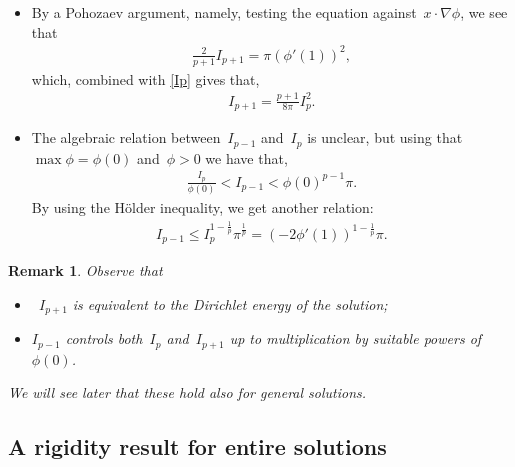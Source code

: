 \documentclass[10pt]{amsart}
\newtheorem{remark}[theorem]{Remark}
\begin{document}
    \begin{itemize}
        \item[(a)] By a Pohozaev argument, namely, testing the equation against~$x\cdot\nabla\phi$, we see that
        \begin{align*}
            \frac{2}{p+1}I_{p+1}=\pi (\phi'(1))^2,
        \end{align*}
        which, combined with \eqref{Ip} gives that,
        \begin{align*}
            I_{p+1}=\frac{p+1}{8\pi}I_p^2.
        \end{align*}

        \item[(b)] The algebraic relation between~$I_{p-1}$ and~$I_p$ is unclear, but using that~$\max\phi=\phi(0)$ and~$\phi>0$ we have that,
        \begin{align*}
            \frac{I_p}{\phi(0)}<I_{p-1}< \phi(0)^{p-1} \pi.
        \end{align*}
        By using the H\"older inequality, we get another relation:
        \begin{align*}
            I_{p-1}\leq I_p^{1-\frac{1}{p}}\pi^{\frac{1}{p}} = (-2\phi'(1))^{1-\frac{1}{p}} \pi.
        \end{align*}
    \end{itemize}

    \begin{remark}
        Observe that
        \begin{itemize}
            \item[(i)] ~$I_{p+1}$ is equivalent to the Dirichlet energy of the solution;
            \item[(ii)] $I_{p-1}$ controls both~$I_p$ and~$I_{p+1}$ up to multiplication by suitable powers of~$\phi(0)$.
        \end{itemize}
        We will see later that these hold also for general solutions.
    \end{remark}

\subsection{A rigidity result for entire solutions}
\end{document}
